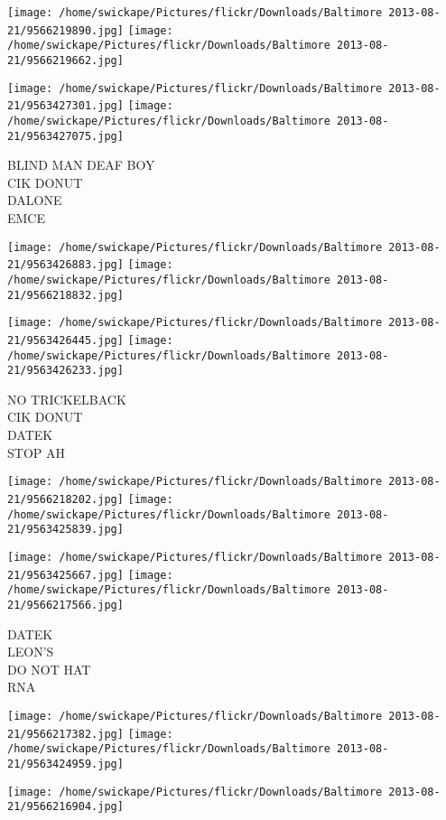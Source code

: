 \documentclass[10pt,letterpaper]{article}
\begin{document}
\texttt{[image: /home/swickape/Pictures/flickr/Downloads/Baltimore 2013-08-21/9566219890.jpg]}
\texttt{[image: /home/swickape/Pictures/flickr/Downloads/Baltimore 2013-08-21/9566219662.jpg]}

\texttt{[image: /home/swickape/Pictures/flickr/Downloads/Baltimore 2013-08-21/9563427301.jpg]}
\texttt{[image: /home/swickape/Pictures/flickr/Downloads/Baltimore 2013-08-21/9563427075.jpg]}

BLIND MAN DEAF BOY\\
CIK DONUT\\
DALONE\\
EMCE
\pagebreak

\texttt{[image: /home/swickape/Pictures/flickr/Downloads/Baltimore 2013-08-21/9563426883.jpg]}
\texttt{[image: /home/swickape/Pictures/flickr/Downloads/Baltimore 2013-08-21/9566218832.jpg]}

\texttt{[image: /home/swickape/Pictures/flickr/Downloads/Baltimore 2013-08-21/9563426445.jpg]}
\texttt{[image: /home/swickape/Pictures/flickr/Downloads/Baltimore 2013-08-21/9563426233.jpg]}

NO TRICKELBACK\\
CIK DONUT\\
DATEK\\
STOP AH
\pagebreak

\texttt{[image: /home/swickape/Pictures/flickr/Downloads/Baltimore 2013-08-21/9566218202.jpg]}
\texttt{[image: /home/swickape/Pictures/flickr/Downloads/Baltimore 2013-08-21/9563425839.jpg]}

\texttt{[image: /home/swickape/Pictures/flickr/Downloads/Baltimore 2013-08-21/9563425667.jpg]}
\texttt{[image: /home/swickape/Pictures/flickr/Downloads/Baltimore 2013-08-21/9566217566.jpg]}

DATEK\\
LEON'S\\
DO NOT HAT\\
RNA
\pagebreak

\texttt{[image: /home/swickape/Pictures/flickr/Downloads/Baltimore 2013-08-21/9566217382.jpg]}
\texttt{[image: /home/swickape/Pictures/flickr/Downloads/Baltimore 2013-08-21/9563424959.jpg]}

\vspace{0.25in}
\texttt{[image: /home/swickape/Pictures/flickr/Downloads/Baltimore 2013-08-21/9566216904.jpg]}
\end{document}
